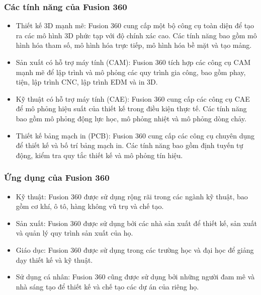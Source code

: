 \documentclass{article} %
\begin{document}
	\subsubsection{Các tính năng của Fusion 360}
	
	\begin{itemize}
		\item Thiết kế 3D mạnh mẽ: Fusion 360 cung cấp một bộ công cụ toàn diện để tạo ra các mô hình 3D phức tạp với độ chính xác cao. Các tính năng bao gồm mô hình hóa tham số, mô hình hóa trực tiếp, mô hình hóa bề mặt và tạo mảng.
		
		\item Sản xuất có hỗ trợ máy tính (CAM): Fusion 360 tích hợp các công cụ CAM mạnh mẽ để lập trình và mô phỏng các quy trình gia công, bao gồm phay, tiện, lập trình CNC, lập trình EDM và in 3D.
		
		\item Kỹ thuật có hỗ trợ máy tính (CAE): Fusion 360 cung cấp các công cụ CAE để mô phỏng hiệu suất của thiết kế trong điều kiện thực tế. Các tính năng bao gồm mô phỏng động lực học, mô phỏng nhiệt và mô phỏng dòng chảy.
		
		\item Thiết kế bảng mạch in (PCB): Fusion 360 cung cấp các công cụ chuyên dụng để thiết kế và bố trí bảng mạch in. Các tính năng bao gồm định tuyến tự động, kiểm tra quy tắc thiết kế và mô phỏng tín hiệu.
		
	\end{itemize}
	
	\subsubsection{Ứng dụng của Fusion 360}
	\begin{itemize}
		\item Kỹ thuật: Fusion 360 được sử dụng rộng rãi trong các ngành kỹ thuật, bao gồm cơ khí, ô tô, hàng không vũ trụ và chế tạo.
		
		\item Sản xuất: Fusion 360 được sử dụng bởi các nhà sản xuất để thiết kế, sản xuất và quản lý quy trình sản xuất của họ.
		
		\item Giáo dục: Fusion 360 được sử dụng trong các trường học và đại học để giảng dạy thiết kế và kỹ thuật.
		
		\item Sử dụng cá nhân: Fusion 360 cũng được sử dụng bởi những người đam mê và nhà sáng tạo để thiết kế và chế tạo các dự án của riêng họ.
		
	\end{itemize}
\end{document}
